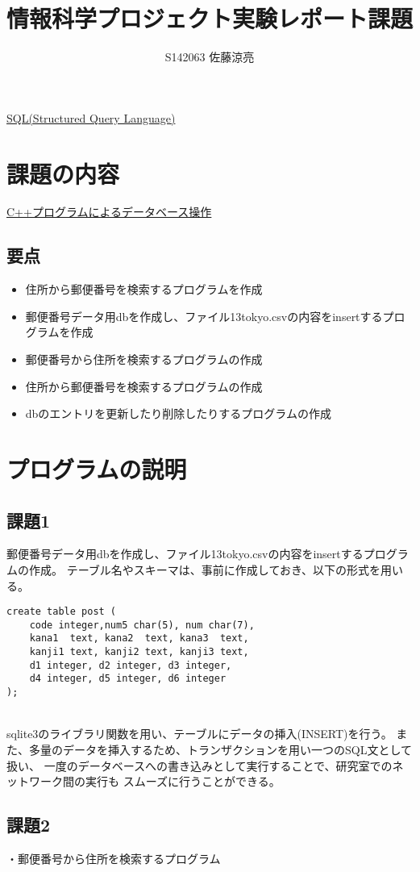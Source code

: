 \documentclass[a4j]{jarticle}
\title{情報科学プロジェクト実験レポート課題}
\author{S142063 佐藤涼亮}
\begin{document}
\maketitle
\centerline{\LARGE \underline{SQL(Structured Query Language)}}
\section{課題の内容}
{\large \underline{C++プログラムによるデータベース操作}}
\subsection{要点}
\begin{itemize}
\item 住所から郵便番号を検索するプログラムを作成
\item 郵便番号データ用dbを作成し、ファイル13tokyo.csvの内容をinsertするプログラムを作成
\item 郵便番号から住所を検索するプログラムの作成
\item 住所から郵便番号を検索するプログラムの作成
\item dbのエントリを更新したり削除したりするプログラムの作成
\end{itemize}
\section{プログラムの説明}
\subsection{課題1}
郵便番号データ用dbを作成し、ファイル13tokyo.csvの内容をinsertするプログラムの作成。
テーブル名やスキーマは、事前に作成しておき、以下の形式を用いる。
\begin{screen}
\begin{verbatim}
create table post (
    code integer,num5 char(5), num char(7), 
    kana1  text, kana2  text, kana3  text,
    kanji1 text, kanji2 text, kanji3 text,
    d1 integer, d2 integer, d3 integer,
    d4 integer, d5 integer, d6 integer
);
\end{verbatim}
\end{screen}
\\
sqlite3のライブラリ関数を用い、テーブルにデータの挿入(INSERT)を行う。
また、多量のデータを挿入するため、トランザクションを用い一つのSQL文として扱い、
一度のデータベースへの書き込みとして実行することで、研究室でのネットワーク間の実行も
スムーズに行うことができる。

\subsection{課題2}
・郵便番号から住所を検索するプログラム
\end{document}
